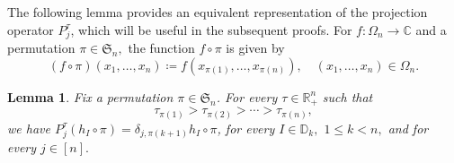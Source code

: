 \documentclass{amsart}
\numberwithin{equation}{section}
\newtheorem{lem}[thm]{Lemma}
\theoremstyle{definition}
\theoremstyle{remark}
\newcommand{\1}{\mathbf 1}
\begin{document}
The following lemma provides an equivalent representation of the projection operator $P^{\tau}_{j}$, which will be useful in the subsequent proofs. For $f:\Omega_n\to \mathbb{C}$ and a permutation $\pi\in \mathfrak{S}_{n},$ the function $f\circ \pi$ is given by
$$(f\circ\pi)(x_{1},\dots,x_{n})\coloneqq f(x_{\pi(1)},\dots, x_{\pi(n)}),\quad (x_{1},\dots, x_{n})\in \Omega_n.$$
\begin{lem}\label{main sijie lemma}
Fix a permutation $\pi\in\mathfrak{S}_n$. For every $\tau\in \mathbb{R}^n_{+}$ such that
\begin{equation}\label{tau vs pi eq}
\tau_{\pi(1)}>\tau_{\pi(2)}>\cdots>\tau_{\pi(n)},
\end{equation}
we have $P_j^{\tau}(h_I\circ\pi)=\delta_{j,\pi(k+1)}h_I\circ\pi$, for every $I\in\mathbb{D}_k,$ $1\leq k<n,$ and for every $j\in [n].$
\end{lem}
\end{document}
